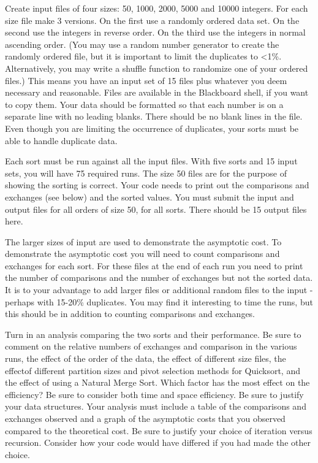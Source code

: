 \documentclass[10pt,letterpaper,final]{report}
\begin{document}
Create input files of four sizes: 50, 1000, 2000, 5000 and 10000 integers. For each size file make 3 versions. On the first use a randomly ordered data set. On the second use the integers in reverse order. On the third use the integers in normal ascending order. (You may use a random number generator to create the randomly ordered file, but it is important to limit the duplicates to <1\%. Alternatively, you may write a shuffle function to randomize one of your ordered files.) This means you have an input set of 15 files plus whatever you deem necessary and reasonable. Files are available in the Blackboard shell, if you want to copy them. Your data should be formatted so that each number is on a separate line with no leading blanks. There should be no blank lines in the file. Even though you are limiting the occurrence of duplicates, your sorts must be able to handle duplicate data.

Each sort must be run against all the input files. With five sorts and 15 input sets, you will have 75 required runs. The size 50 files are for the purpose of showing the sorting is correct. Your code needs to print out the comparisons and exchanges (see below) and the sorted values. You must submit the input and output files for all orders of size 50, for all sorts. There should be 15 output files here.

The larger sizes of input are used to demonstrate the asymptotic cost. To demonstrate the asymptotic cost you will need to count comparisons and exchanges for each sort. For these files at the end of each run you need to print the number of comparisons and the number of exchanges but not the sorted data. It is to your advantage to add larger files or additional random files to the input - perhaps with 15-20\% duplicates. You may find it interesting to time the runs, but this should be in addition to counting comparisons and exchanges.

Turn in an analysis comparing the two sorts and their performance. Be sure to comment on the relative numbers of exchanges and comparison in the various runs, the effect of the order of the data, the effect of different size files, the effectof different partition sizes and pivot selection methods for Quicksort, and the effect of using a Natural Merge Sort. Which factor has the most effect on the efficiency? Be sure to consider both time and space efficiency. Be sure to justify your data structures. Your analysis must include a table of the comparisons and exchanges observed and a graph of the asymptotic costs that you observed compared to the theoretical cost. Be sure to justify your choice of iteration versus recursion. Consider how your code would have differed if you had made the other choice.
\end{document}
